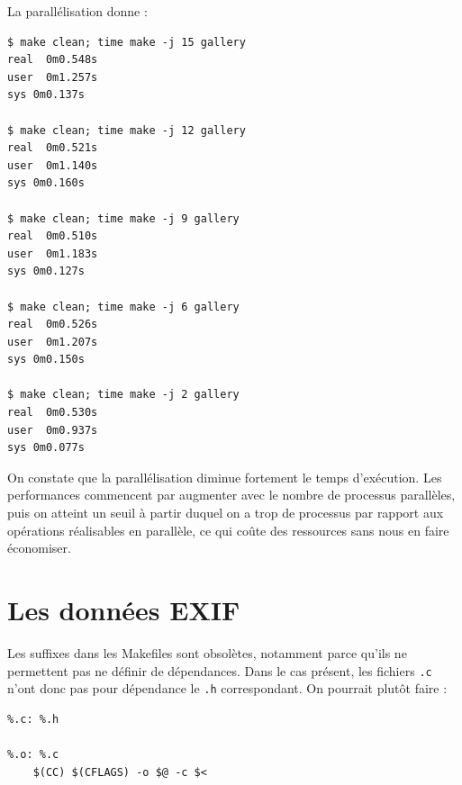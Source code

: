 \documentclass[a4paper,11pt]{article}
\begin{document}
La parallélisation donne :

\begin{verbatim}
$ make clean; time make -j 15 gallery
real  0m0.548s
user  0m1.257s
sys 0m0.137s

$ make clean; time make -j 12 gallery
real  0m0.521s
user  0m1.140s
sys 0m0.160s

$ make clean; time make -j 9 gallery
real  0m0.510s
user  0m1.183s
sys 0m0.127s

$ make clean; time make -j 6 gallery
real  0m0.526s
user  0m1.207s
sys 0m0.150s

$ make clean; time make -j 2 gallery
real  0m0.530s
user  0m0.937s
sys 0m0.077s
\end{verbatim}

On constate que la parallélisation diminue fortement le temps d'exécution. Les
performances commencent par augmenter avec le nombre de processus parallèles, puis
on atteint un seuil à partir duquel on a trop de processus par rapport aux opérations
réalisables en parallèle, ce qui coûte des ressources sans nous en faire économiser.

\section{Les données EXIF}

Les suffixes dans les Makefiles sont obsolètes, notamment parce qu'ils ne permettent pas ne
définir de dépendances. Dans le cas présent, les fichiers \verb+.c+ n'ont donc
pas pour dépendance le \verb+.h+ correspondant. On pourrait plutôt faire :

\begin{verbatim}
%.c: %.h

%.o: %.c
	$(CC) $(CFLAGS) -o $@ -c $<
\end{verbatim}

\end{document}
